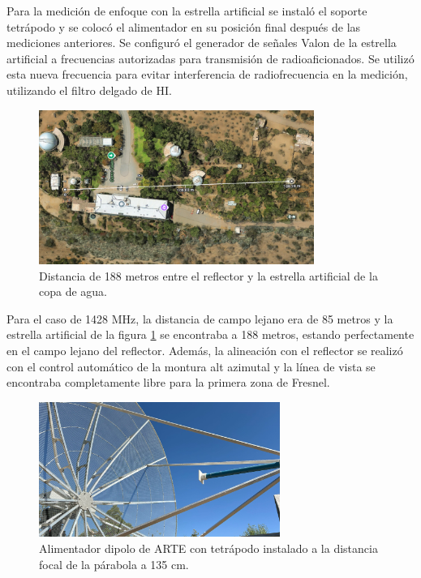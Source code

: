 Para la medición de enfoque con la estrella artificial se instaló el soporte tetrápodo y se colocó el alimentador en su posición final después de las mediciones anteriores. Se configuró el generador de señales Valon de la estrella artificial a frecuencias autorizadas para transmisión de radioaficionados. Se utilizó esta nueva frecuencia para evitar interferencia de radiofrecuencia en la medición, utilizando el filtro delgado de HI.\\

\begin{figure}
    \centering
    \includegraphics[width=0.8\textwidth]{img/188m_measure}
    \caption{Distancia de 188 metros entre el reflector y la estrella artificial de la copa de agua.}
    \label{fig:enfoque2}
\end{figure}

Para el caso de 1428 MHz, la distancia de campo lejano era de 85 metros y la estrella artificial de la figura \ref{fig:enfoque2} se encontraba a 188 metros, estando perfectamente en el campo lejano del reflector. Además, la alineación con el reflector se realizó con el control automático de la montura alt azimutal y la línea de vista se encontraba completamente libre para la primera zona de Fresnel.\\

\begin{figure}
    \centering
    \includegraphics[width=0.7\textwidth]{img/feed_focus}
    \caption{Alimentador dipolo de ARTE con tetrápodo instalado a la distancia focal de la párabola a 135 cm.}
    \label{fig:enfoque3}
\end{figure}

